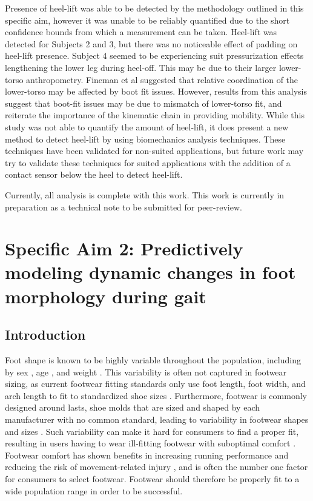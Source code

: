 \documentclass[defaultstyle,11pt]{comps}
\begin{document}
Presence of heel-lift was able to be detected by the methodology outlined in this specific aim, however it was unable to be reliably quantified due to the short confidence bounds from which a measurement can be taken.
Heel-lift was detected for Subjects 2 and 3, but there was no noticeable effect of padding on heel-lift presence.
Subject 4 seemed to be experiencing suit pressurization effects lengthening the lower leg during heel-off.
This may be due to their larger lower-torso anthropometry.
Fineman et al \citep{Fineman2018} suggested that relative coordination of the lower-torso may be affected by boot fit issues.
However, results from this analysis suggest that boot-fit issues may be due to mismatch of lower-torso fit, and reiterate the importance of the kinematic chain in providing mobility.
While this study was not able to quantify the amount of heel-lift, it does present a new method to detect heel-lift by using biomechanics analysis techniques.
These techniques have been validated for non-suited applications, but future work may try to validate these techniques for suited applications with the addition of a contact sensor below the heel to detect heel-lift.

Currently, all analysis is complete with this work.
This work is currently in preparation as a technical note to be submitted for peer-review.

\hypertarget{specific-aim-2-predictively-modeling-dynamic-changes-in-foot-morphology-during-gait}{%
\chapter{Specific Aim 2: Predictively modeling dynamic changes in foot morphology during gait}\label{specific-aim-2-predictively-modeling-dynamic-changes-in-foot-morphology-during-gait}}

\hypertarget{introduction-1}{%
\section{Introduction}\label{introduction-1}}

Foot shape is known to be highly variable throughout the population, including by sex \citep{Wunderlich2001, Krauss2008, Krauss2010}, age \citep{Tomassoni2014}, and weight \citep{Price2016}.
This variability is often not captured in footwear sizing, as current footwear fitting standards only use foot length, foot width, and arch length to fit to standardized shoe sizes \citep{ASTM2017}.
Furthermore, footwear is commonly designed around lasts, shoe molds that are sized and shaped by each manufacturer with no common standard, leading to variability in footwear shapes and sizes \citep{Jurca2013, Wannop2019}.
Such variability can make it hard for consumers to find a proper fit, resulting in users having to wear ill-fitting footwear with suboptimal comfort \citep{Dobson2018b}.
Footwear comfort has shown benefits in increasing running performance \citep{Luo2009} and reducing the risk of movement-related injury \citep{Mundermann2001a}, and is often the number one \citep{Martinez-Martinez2017} factor for consumers to select footwear.
Footwear should therefore be properly fit to a wide population range in order to be successful.
\end{document}
